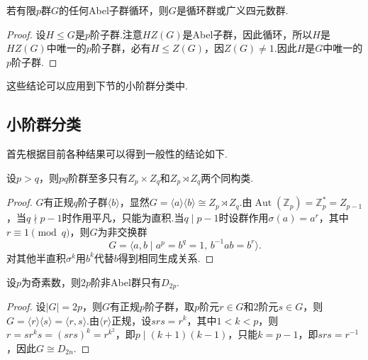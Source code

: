 \begin{cor*}
	若有限$p$群$G$的任何Abel子群循环，则$G$是循环群或广义四元数群.
\end{cor*}
\begin{proof}
	设$H\le G$是$p$阶子群.注意$HZ(G)$是Abel子群，因此循环，所以$H$是$HZ(G)$中唯一的$p$阶子群，必有$H\le Z(G)$，因$Z(G)\ne 1$.因此$H$是$G$中唯一的$p$阶子群.
\end{proof}

这些结论可以应用到下节的小阶群分类中.

\subsection{小阶群分类}\label{subsec:ClassificationSmallOrder}
首先根据目前各种结果可以得到一般性的结论如下.
\begin{prop}
	设$p>q$，则$pq$阶群至多只有$Z_p\times Z_q$和$Z_p\rtimes Z_q$两个同构类.
\end{prop}
\begin{proof}
	$G$有正规$q$阶子群$\langle b\rangle $，显然$G=\langle a\rangle\langle b\rangle \cong Z_p\rtimes Z_q$.由$\operatorname*{Aut}(\mathbb{Z}_p)=\mathbb{Z}_p^*=Z_{p-1}$，当$q\nmid p-1$时作用平凡，只能为直积.当$q\mid p-1$时设群作用$\sigma(a)=a^r$，其中$r\equiv 1\pmod{q}$，则$G$为非交换群
	\[
		G=\langle a,b\mid a^p=b^q=1,\,b^{-1}ab=b^r\rangle .
	\]
	对其他半直积$\sigma^k$用$b^k$代替$b$得到相同生成关系.
\end{proof}
\begin{prop}
	设$p$为奇素数，则$2p$阶非Abel群只有$D_{2p}$.
\end{prop}
\begin{proof}
	设$|G|=2p$，则$G$有正规$p$阶子群，取$p$阶元$r\in G$和$2$阶元$s\in G$，则$G=\langle r\rangle \langle s\rangle =\langle r,s\rangle $.由$\langle r\rangle $正规，设$srs=r^k$，其中$1<k<p$，则$r=sr^ks=(srs)^k=r^{k^2}$，即$p\mid(k+1)(k-1)$，只能$k=p-1$，即$srs=r^{-1}$，因此$G\cong D_{2n}$.
\end{proof}

